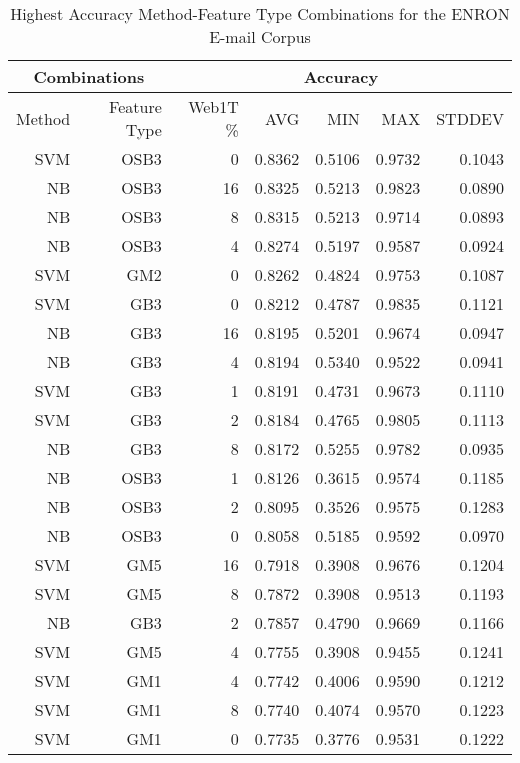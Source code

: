 	
	\begin{table}[htbp!]
			\begin{center}
			\begin{tabular}{ | r | r | r | r | r | r | r | }
			\hline
			\multicolumn{2}{|c|}{Combinations} & \multicolumn{5}{|c|}{Accuracy}\\
			\hline
			Method & Feature Type & Web1T \% & AVG & MIN & MAX & STDDEV\\ \hline 
			SVM & OSB3 & 0 & 0.8362 & 0.5106 & 0.9732 & 0.1043\\ \hline 
			NB & OSB3 & 16 & 0.8325 & 0.5213 & 0.9823 & 0.0890\\ \hline 
			NB & OSB3 & 8 & 0.8315 & 0.5213 & 0.9714 & 0.0893\\ \hline 
			NB & OSB3 & 4 & 0.8274 & 0.5197 & 0.9587 & 0.0924\\ \hline 
			SVM & GM2 & 0 & 0.8262 & 0.4824 & 0.9753 & 0.1087\\ \hline 
			SVM & GB3 & 0 & 0.8212 & 0.4787 & 0.9835 & 0.1121\\ \hline 
			NB & GB3 & 16 & 0.8195 & 0.5201 & 0.9674 & 0.0947\\ \hline 
			NB & GB3 & 4 & 0.8194 & 0.5340 & 0.9522 & 0.0941\\ \hline 
			SVM & GB3 & 1 & 0.8191 & 0.4731 & 0.9673 & 0.1110\\ \hline 
			SVM & GB3 & 2 & 0.8184 & 0.4765 & 0.9805 & 0.1113\\ \hline 
			NB & GB3 & 8 & 0.8172 & 0.5255 & 0.9782 & 0.0935\\ \hline 
			NB & OSB3 & 1 & 0.8126 & 0.3615 & 0.9574 & 0.1185\\ \hline 
			NB & OSB3 & 2 & 0.8095 & 0.3526 & 0.9575 & 0.1283\\ \hline 
			NB & OSB3 & 0 & 0.8058 & 0.5185 & 0.9592 & 0.0970\\ \hline 
			SVM & GM5 & 16 & 0.7918 & 0.3908 & 0.9676 & 0.1204\\ \hline 
			SVM & GM5 & 8 & 0.7872 & 0.3908 & 0.9513 & 0.1193\\ \hline 
			NB & GB3 & 2 & 0.7857 & 0.4790 & 0.9669 & 0.1166\\ \hline 
			SVM & GM5 & 4 & 0.7755 & 0.3908 & 0.9455 & 0.1241\\ \hline 
			SVM & GM1 & 4 & 0.7742 & 0.4006 & 0.9590 & 0.1212\\ \hline 
			SVM & GM1 & 8 & 0.7740 & 0.4074 & 0.9570 & 0.1223\\ \hline 
			SVM & GM1 & 0 & 0.7735 & 0.3776 & 0.9531 & 0.1222\\ \hline 

			\end{tabular}
		\caption{Highest Accuracy Method-Feature Type Combinations for the ENRON E-mail Corpus}
		\label{tab:enron-accuracy-filtered-ranked}
		\end{center}
	\end{table}
	


